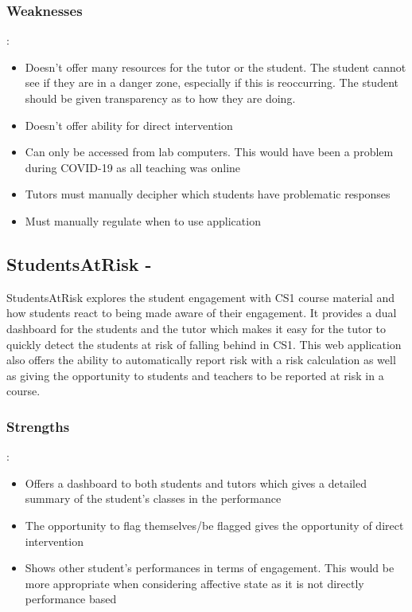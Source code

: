 \documentclass{l4proj}
\begin{document}
\subsubsection{Weaknesses}:
\begin{itemize}
\item Doesn’t offer many resources for the tutor or the student. The student cannot see if they are in a danger zone, especially if this is reoccurring. The student should be given transparency as to how they are doing.
\item Doesn’t offer ability for direct intervention
\item Can only be accessed from lab computers. This would have been a problem during COVID-19 as all teaching was online 
\item Tutors must manually decipher which students have problematic responses
\item Must manually regulate when to use application

\end{itemize}
\label{SAR}\subsection{StudentsAtRisk - \cite{ada_developing_2020}}
StudentsAtRisk explores the student engagement with CS1 course material and how students react to being made aware of their engagement. It provides a dual dashboard for the students and the tutor which makes it easy for the tutor to quickly detect the students at risk of falling behind in CS1. This web application also offers the ability to automatically report risk with a risk calculation as well as giving the opportunity to students and teachers to be reported at risk in a course.
\subsubsection{Strengths}:
\begin{itemize}
    \item Offers a dashboard to both students and tutors which gives a detailed summary of the student’s classes in the performance
    \item The opportunity to flag themselves/be flagged gives the opportunity of direct intervention
    \item Shows other student’s performances in terms of engagement. This would be more appropriate when considering affective state as it is not directly performance based
\end{itemize}
\end{document}

